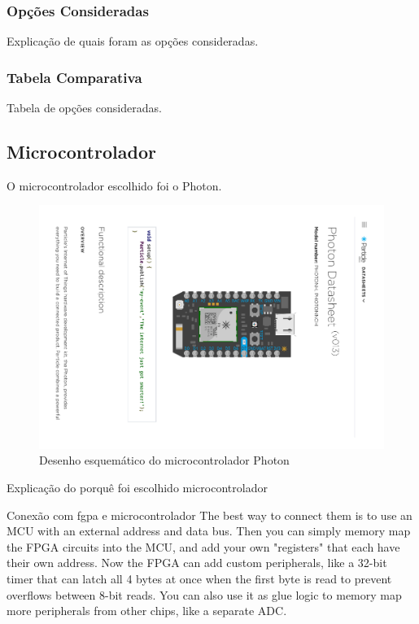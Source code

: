 	\subsubsection{Opções Consideradas}\label{fpga-options}
	
	Explicação de quais foram as opções consideradas.
	
	\subsubsection{Tabela Comparativa}\label{fpga-table}
	
	Tabela de opções consideradas.
	
	\subsection{Microcontrolador}\label{hard-uc}
	
	O microcontrolador escolhido foi o Photon.
	
	\begin{figure}[htb]
		\caption{\label{fig_photon} Desenho esquemático do microcontrolador Photon}
		\begin{center}
			\includegraphics[width=0.5\textheight, trim={11.7cm 7.9cm 7.8cm 7.4cm}, clip]{photon.pdf}
		\end{center}
	\end{figure}

	
	Explicação do porquê foi escolhido microcontrolador
	
	Conexão com fgpa e microcontrolador
	The best way to connect them is to use an MCU with an external address and data bus. Then you can simply memory map the FPGA circuits into the MCU, and add your own "registers" that each have their own address. Now the FPGA can add custom peripherals, like a 32-bit timer that can latch all 4 bytes at once when the first byte is read to prevent overflows between 8-bit reads. You can also use it as glue logic to memory map more peripherals from other chips, like a separate ADC.
	
